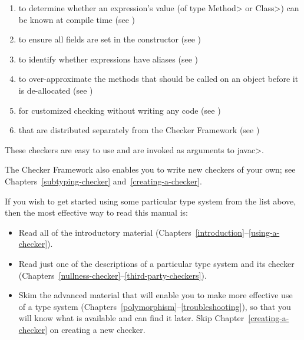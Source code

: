 \begin{enumerate}
  (see )
\item
   to determine
  whether an expression's value (of type \<Method> or \<Class>) can be known at compile time
  (see )
\item
   to ensure all
  fields are set in the constructor (see
  )
\item
   to identify whether
  expressions have aliases (see )
\item
   to over-approximate the
  methods that should be called on an object before it is de-allocated (see )
\item
   for customized checking without
  writing any code (see )
\item
   that are distributed
  separately from the Checker Framework
  (see )

\end{enumerate}

\noindent
These checkers are easy to use and are invoked as arguments to \<javac>.


The Checker Framework also enables you to write new checkers of your
own; see Chapters~\ref{subtyping-checker} and~\ref{creating-a-checker}.



If you wish to get started using some particular type system from the list
above, then the most effective way to read this manual is:

\begin{itemize}
\item
  Read all of the introductory material
  (Chapters~\ref{introduction}--\ref{using-a-checker}).
\item
  Read just one of the descriptions of a particular type system and its
  checker (Chapters~\ref{nullness-checker}--\ref{third-party-checkers}).
\item
  Skim the advanced material that will enable you to make more effective
  use of a type system
  (Chapters~\ref{polymorphism}--\ref{troubleshooting}), so that you will
  know what is available and can find it later.  Skip
  Chapter~\ref{creating-a-checker} on creating a new checker.
\end{itemize}


